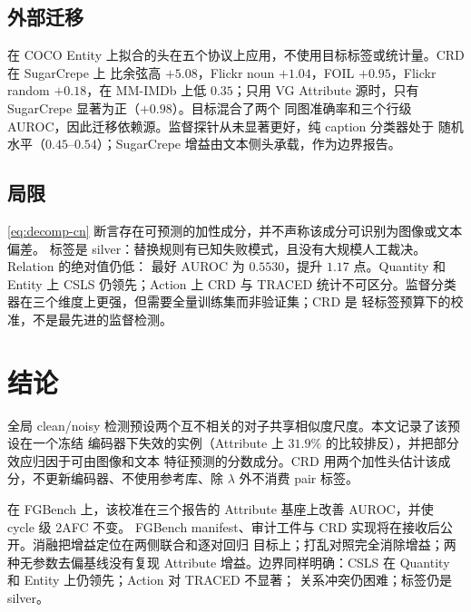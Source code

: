 \documentclass[10pt,twocolumn,a4paper]{ctexart}
\begin{document}
\subsection{外部迁移}
在 COCO Entity 上拟合的头在五个协议上应用，不使用目标标签或统计量。CRD 在 SugarCrepe 上
比余弦高 $+5.08$，Flickr noun $+1.04$，FOIL $+0.95$，Flickr random $+0.18$，在 MM-IMDb
上低 $0.35$；只用 VG Attribute 源时，只有 SugarCrepe 显著为正（$+0.98$）。目标混合了两个
同图准确率和三个行级 AUROC，因此迁移依赖源。监督探针从未显著更好，纯 caption 分类器处于
随机水平（$0.45$--$0.54$）；SugarCrepe 增益由文本侧头承载，作为边界报告。

\subsection{局限}
\eqref{eq:decomp-cn} 断言存在可预测的加性成分，并不声称该成分可识别为图像或文本偏差。
标签是 silver：替换规则有已知失败模式，且没有大规模人工裁决。Relation 的绝对值仍低：
最好 AUROC 为 $0.5530$，提升 $1.17$ 点。Quantity 和 Entity 上 CSLS 仍领先；Action 上 CRD
与 TRACED 统计不可区分。监督分类器在三个维度上更强，但需要全量训练集而非验证集；CRD 是
轻标签预算下的校准，不是最先进的监督检测。

\section{结论}
\label{sec:conclusion-cn}

全局 clean/noisy 检测预设两个互不相关的对子共享相似度尺度。本文记录了该预设在一个冻结
编码器下失效的实例（Attribute 上 $31.9\%$ 的比较排反），并把部分效应归因于可由图像和文本
特征预测的分数成分。CRD 用两个加性头估计该成分，不更新编码器、不使用参考库、除 $\lambda$
外不消费 pair 标签。

在 FGBench 上，该校准在三个报告的 Attribute 基座上改善 AUROC，并使 cycle 级 2AFC 不变。
FGBench manifest、审计工件与 CRD 实现将在接收后公开。消融把增益定位在两侧联合和逐对回归
目标上；打乱对照完全消除增益；两种无参数去偏基线没有复现 Attribute 增益。边界同样明确：CSLS 在 Quantity 和 Entity 上仍领先；Action 对 TRACED 不显著；
关系冲突仍困难；标签仍是 silver。
\end{document}
